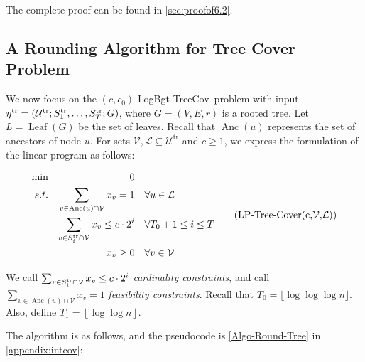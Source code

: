 \documentclass[11pt,a4paper]{article} \usepackage{enumitem}
\newcommand{\floor}[1]{\left\lfloor #1 \right\rfloor}
\newcommand{\calV}{\mathcal{V}}
\newcommand{\calL}{\mathcal{L}}
\newcommand{\calU}{\mathcal{U}}
\newcommand{\LBOtreecov}{\textsf{LogBgt-TreeCov}}
\newcommand{\trU}{\operatorname{\calU^{tr}}}
\newcommand{\trS}[1]{\ifx\relax#1\relax
    S^{\operatorname{tr}} \else
    S^{\operatorname{tr}}_{#1} \fi
}
\newcommand{\treta}{\operatorname{\eta^{tr}}}
\newcommand{\Anc}{\operatorname{Anc}}
\newcommand{\Leaf}{\operatorname{Leaf}}
\theoremstyle{definition}
\begin{document}
The complete proof can be found in \cref{sec:proofof6.2}.
\subsection{A Rounding Algorithm for Tree Cover Problem}\label{sec:Inter-Cover-3}

We now focus on the $(c, c_0)$-\LBOtreecov\ problem with input $\treta=(\trU;\trS{1},\ldots,\trS{T};G)$, where $G=(V,E,r)$ is a rooted tree. Let $L=\Leaf(G)$ be the set of leaves. Recall that $\Anc(u)$ represents the set of ancestors of node $u$.
For sets $\calV,\calL\subseteq \trU$ and $c\ge 1$, we express the formulation of the linear program as follows:

\begin{equation}
\begin{aligned}
\min && 0 && & \\
s.t. && \sum_{v\in \Anc(u)\cap \calV} x_v=1 && & \forall u\in \calL\\
	 && \sum_{v\in \trS{i}\cap \calV} x_v\le c\cdot 2^i && & \forall T_0+1\le i\le T\\
    && x_v \ge 0&& & \forall v\in \calV\\
\end{aligned}
\tag{LP-Tree-Cover(c,$\calV$,$\calL$)}
\label{LP-Tree-Cover}
\end{equation}

We call $\sum_{v\in \trS{i}\cap \calV} x_v\le c\cdot 2^i$ {\em cardinality constraints}, and call $\sum_{v\in \Anc(u)\cap \calV} x_v=1$ {\em feasibility constraints}.
Recall that $T_0 = \lfloor \log \log \log n \rfloor$. Also, define $T_1=\floor{\log\log n}$.

The algorithm is as follows, and the pseudocode is \cref{Algo-Round-Tree} in \cref{appendix:intcov}:
\end{document}
